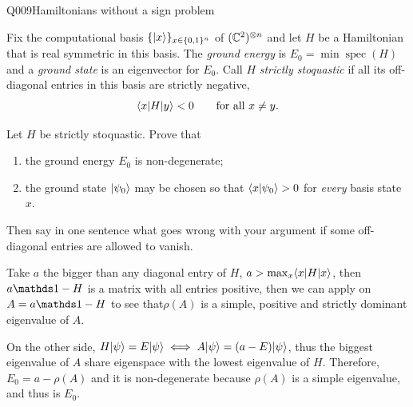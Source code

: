 
\begin{entry}{Q009}{Hamiltonians without a sign problem}


\begin{problem}
Fix the computational basis $\{\lvert x \rangle\}_{x\in\{0,1\}^{n}}$ of $(\mathbb{C}^{2})^{\otimes n}$
and let $H$ be a Hamiltonian that is real symmetric in this basis. The \emph{ground
energy} is $E_0=\min\operatorname{spec}(H)$ and a \emph{ground state} is an eigenvector
for $E_0$. Call $H$ \emph{strictly stoquastic} if all its off-diagonal entries in this
basis are strictly negative,
\[
  \langle x \vert H \vert y \rangle<0 \qquad \text{for all } x\neq y .
\]

Let $H$ be strictly stoquastic. Prove that
\begin{enumerate}[label=\textbf{(\alph*)},leftmargin=*]
  \item the ground energy $E_0$ is non-degenerate;
  \item the ground state $\lvert \psi_0 \rangle$ may be chosen so that $\langle x \vert \psi_0 \rangle>0$ for
        \emph{every} basis state $x$.
\end{enumerate}
Then say in one sentence what goes wrong with your argument if some off-diagonal entries
are allowed to vanish.
\end{problem}


\begin{solution}[Part (a)]
Take $a$ the bigger than any diagonal entry of $H$, $a > \max_x \langle x \vert H \vert x \rangle$, then $a\id - H$ is a matrix with all entries positive, then we can apply  on $A=a\id - H$ to see that$\rho(A)$ is a simple, positive and strictly dominant eigenvalue of $A$. 

On the other side, $H\lvert \psi \rangle=E\lvert \psi \rangle \iff A\lvert \psi \rangle= (a-E)\lvert \psi \rangle $, thus the biggest eigenvalue of $A$ share eigenspace with the lowest eigenvalue of $H$. Therefore, $E_0 = a - \rho(A)$ and it is non-degenerate because $\rho(A)$ is a simple eigenvalue, and thus is $E_0$.
\end{solution}


\end{entry}
